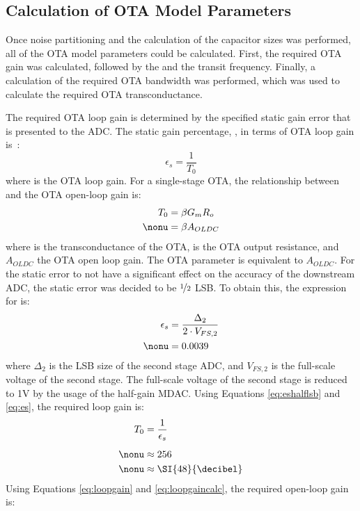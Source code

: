 \subsection{Calculation of OTA Model Parameters}
\label{sec:idealotaparams}
Once noise partitioning and the calculation of the capacitor sizes was performed, all of the OTA model parameters could be calculated. First, the required OTA gain was calculated, followed by the \gmid\spc and the transit 
frequency. Finally, a calculation of the required OTA bandwidth was performed, which was used to calculate the required OTA transconductance. 

The required OTA loop gain is determined by the specified static gain error that is presented to the ADC. The static gain percentage, \es, in terms of OTA loop gain is~\cite{315areader}:
\begin{equation}
\label{eq:es}
\epsilon_{s} = \dfrac{1}{T_{0}}
\end{equation} 
where \tnot\spc is the OTA loop gain. For a single-stage OTA, the relationship between \tnot\spc and the OTA open-loop gain is:
\begin{align}
\label{eq:loopgain}
T_{0} &= \beta G_{m} R_{o} \\
\nonu &= \beta A_{OLDC}
\end{align}
where \Gm\spc is the transconductance of the OTA, \Ro\spc is the OTA output resistance, and $A_{OLDC}$ the OTA open loop gain. The \Gain\spc OTA parameter is equivalent to $A_{OLDC}$. 
For the static error to not have a significant effect on the accuracy of the downstream ADC, the static error was decided to be $\nicefrac{1}{2}$ LSB. To obtain this, the expression for \es\spc is:
\begin{align}
\label{eq:eshalflsb}
\epsilon_{s} &= \dfrac{\Delta_{2}}{2\cdot V_{FS,2}} \\
\nonu &= 0.0039
\end{align}
where $\Delta_{2}$ is the LSB size of the second stage ADC, and $V_{FS,2}$ is the full-scale voltage of the second stage. The full-scale voltage of the second stage is reduced to 1V by the usage of the half-gain MDAC. Using Equations \ref{eq:eshalflsb} and \ref{eq:es}, the required loop gain is: 
\begin{align}
\label{eq:loopgaincalc}
T_{0} &= \dfrac{1}{\epsilon_{s}} \\[0.5em]
\nonu &\approx 256 \\
\nonu &\approx \SI{48}{\decibel}
\end{align}
Using Equations \ref{eq:loopgain} and \ref{eq:loopgaincalc}, the required open-loop gain is:
